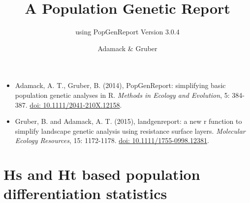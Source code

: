 \documentclass[a4paper]{scrartcl}\usepackage[]{graphicx}\usepackage[]{color}
\begin{document}
\title{A Population Genetic Report}


\subtitle {using PopGenReport Version  3.0.4 }

\author{Adamack \& Gruber}
\maketitle

\begin{itemize}
  \item Adamack, A. T., Gruber, B. (2014), PopGenReport: simplifying basic population genetic analyses in R. \emph{Methods in Ecology and Evolution}, 5: 384-387. \href{http://onlinelibrary.wiley.com/doi/10.1111/2041-210X.12158/full}{doi: 10.1111/2041-210X.12158}.
  \item Gruber, B. and Adamack, A. T. (2015), landgenreport: a new r function to simplify landscape genetic analysis using resistance surface layers. \emph{Molecular Ecology Resources}, 15: 1172-1178. \href{http://onlinelibrary.wiley.com/doi/10.1111/1755-0998.12381/full}{doi: 10.1111/1755-0998.12381}.
\end{itemize}


  

\tableofcontents
\newpage




\section{Hs and Ht based population differentiation statistics}
\end{document}
